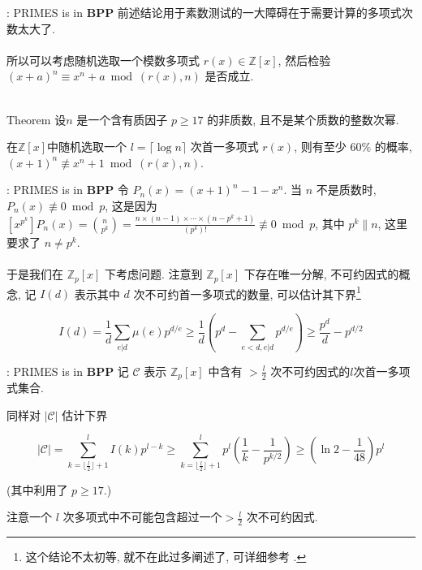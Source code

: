 \documentclass{beamer}
\def\ge{\geqslant}
\begin{document}
\begin{frame}{\cite{AB99}: \textsf{PRIMES} is in \textbf{BPP}}
	前述结论用于素数测试的一大障碍在于需要计算的多项式次数太大了.\\~\\
	
	所以可以考虑随机选取一个模数多项式 $r(x) \in \mathbb Z[x]$, 然后检验$(x + a)^n \equiv x^n + a \bmod (r(x), n)$ 是否成立.\\~\\

	\begin{block}{Theorem}
		设$n$ 是一个含有质因子 $p \ge 17$ 的非质数, 且不是某个质数的整数次幂.
		
		在$\mathbb Z[x]$中随机选取一个 $l = \lceil \log n \rceil$ 次首一多项式 $r(x)$, 则有至少 $60\%$ 的概率, $(x + 1)^n \not\equiv x^n + 1 \bmod (r(x), n)$.
	\end{block}
	
\end{frame}
\begin{frame}{\cite{AB99}: \textsf{PRIMES} is in \textbf{BPP}}
	令 $P_n(x) = (x + 1)^n - 1 - x^n$. 当 $n$ 不是质数时, $P_n(x) \not\equiv 0 \bmod p$, 这是因为$[x^{p^k}] P_n(x) = \binom{n}{p^k} = \frac{n \times (n-1) \times \cdots \times (n-p^k+1)}{(p^k)!} \not\equiv 0 \bmod p$, 其中 $p^k \| n$, 这里要求了 $n \neq p^k$.\\~\\

	于是我们在 $\mathbb Z_p[x]$ 下考虑问题. 注意到 $\mathbb Z_p[x]$ 下存在唯一分解, 不可约因式的概念, 记 $I(d)$ 表示其中 $d$ 次不可约首一多项式的数量, 可以估计其下界\footnote{\tiny 这个结论不太初等, 就不在此过多阐述了, 可详细参考 \cite{lidl_niederreiter_1994}.}

	$$ I(d) = \frac{1}{d}\sum_{e | d}\mu(e)p^{d/e} \ge \frac{1}{d}\left( p^d -  \sum_{e < d, e | d}p^{d/e}\right) \ge \frac{p^d}{d} - p^{d/2} $$
\end{frame}
\begin{frame}{\cite{AB99}: \textsf{PRIMES} is in \textbf{BPP}}
	记 $\mathcal C$ 表示 $\mathbb Z_p[x]$ 中含有 $> \frac{l}{2}$ 次不可约因式的$l$次首一多项式集合. 
	
	同样对 $|\mathcal C|$ 估计下界

	$$|\mathcal C| = \sum_{k = \lfloor \frac l2 \rfloor + 1}^{l}I(k)p^{l-k} \ge \sum_{k = \lfloor \frac l2 \rfloor + 1}^{l}p^l\left(\frac 1k - \frac{1}{p^{k/2}}\right) \ge \left(\ln 2 - \frac{1}{48}\right)p^l$$

	(其中利用了 $p \ge 17$.)

	注意一个 $l$ 次多项式中不可能包含超过一个$> \frac{l}{2}$ 次不可约因式.
\end{frame}
\end{document}
